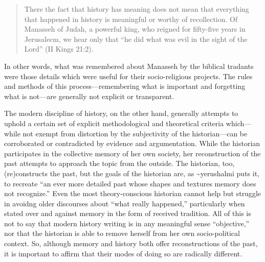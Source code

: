 \begin{quote}
There the fact that history has meaning does not mean that everything
that happened in history is meaningful or worthy of recollection. Of
Manasseh of Judah, a powerful king, who reigned for fifty-five years in
Jerusalecm, we hear only that ``he did what was evil in the sight of the
Lord'' (II Kings 21:2).\autocite[10]{yerushalmi1989}
\end{quote}

In other words, what was remembered about Manasseh by the biblical
tradants were those details which were useful for their socio-religious
projects. The rules and methods of this process---remembering what is
important and forgetting what is not---are generally not explicit or
transparent.

The modern discipline of history, on the other hand, generally attempts
to uphold a certain set of explicit methodological and theoretical
criteria which---while not exempt from distortion by the subjectivity of
the historian---can be corroborated or contradicted by evidence and
argumentation.\autocite[As Daniel Pioske puts it, ``What separates the
act of historiography from the recounting of a culture's sanctioned
memories is consequently the historians' determination to isolate and
compare disparate testimonies about the past with other past traces that
may corroborate or discredit their
claims.''][302--303]{pioske_bibint2015} While the historian participates
in the collective memory of her own society, her reconstruction of the
past attempts to approach the topic from the outside. The historian,
too, (re)constructs the past, but the goals of the historian are, as
\textasciitilde{}yerushalmi puts it, to recreate ``an ever more detailed
past whose shapes and textures memory does not
recognize.''\autocites[94]{yerushalmi1989}[See
also][532]{verovsek_pgi2016} Even the most theory-conscious historian
cannot help but struggle in avoidng older discourses about ``what really
happened,'' particularly when stated over and against memory in the form
of received tradition. All of this is not to say that modern history
writing is in any meaningful sense ``objective,'' nor that the historian
is able to remove herself from her own socio-political context. So,
although memory and history both offer reconstructions of the past, it
is important to affirm that their modes of doing so are radically
different.\autocite[Pioske observes, ``The epistemological tension
observed by Ricoeur between memory and history is thus understood as the
outcome of two processes that, though having the similar intent of
re-presenting former phenomena, nevertheless pursue and mediate the past
through quite disparate means.''][302]{pioske_bibint2015}

